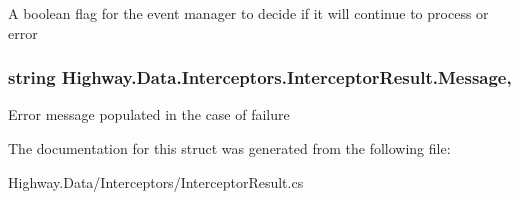 A boolean flag for the event manager to decide if it will continue to process or error 

\hypertarget{struct_highway_1_1_data_1_1_interceptors_1_1_interceptor_result_a7b315c3700250dd60167d7313241eeff}{
\subsubsection[{Message}]{\setlength{\rightskip}{0pt plus 5cm}string Highway.\-Data.\-Interceptors.\-Interceptor\-Result.\-Message\hspace{0.3cm}{\ttfamily [get]}, {\ttfamily [set]}}}\label{struct_highway_1_1_data_1_1_interceptors_1_1_interceptor_result_a7b315c3700250dd60167d7313241eeff}


Error message populated in the case of failure 



The documentation for this struct was generated from the following file\-:\begin{DoxyCompactItemize}
\item 
Highway.\-Data/\-Interceptors/Interceptor\-Result.\-cs\end{DoxyCompactItemize}
